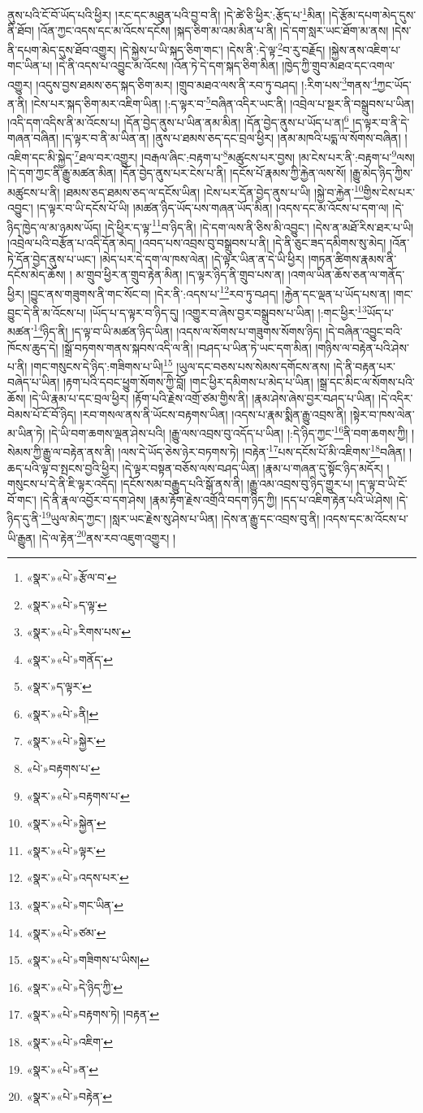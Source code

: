ནུས་པའི་ངོ་བོ་ཡོད་པའི་ཕྱིར། །རང་དང་མཐུན་པའི་བྱ་བ་ནི། །དེ་ཚེ་ཅི་ཕྱིར་:རྩོད་པ་\footnote{«སྣར་»«པེ་»རྩོལ་བ་}མིན། །དེ་རྩོམ་དཔག་མེད་དུས་ནི་ཐོབ། །འོན་ཀྱང་འདས་དང་མ་འོངས་དངོས། །སྐད་ཅིག་མ་འམ་མིན་པ་ནི། །དེ་དག་སླར་ཡང་ཐོག་མ་ནས། །དེས་ནི་དཔག་མེད་དུས་ཐོབ་འགྱུར། །དེ་སྐྱེས་པ་ཡི་སྐད་ཅིག་གང་། །དེས་ནི་:དེ་ལྟ་\footnote{«སྣར་»«པེ་»ད་ལྟ་}བ་རུ་བརྗོད། །སྐྱེས་ནས་འཇིག་པ་གང་ཡིན་པ། །དེ་ནི་འདས་པ་འབྱུང་མ་འོངས། །འོན་ཏེ་དེ་དག་སྐད་ཅིག་མིན། །ཁྱེད་ཀྱི་གྲུབ་མཐའ་དང་འགལ་འགྱུར། །འདུས་བྱས་ཐམས་ཅད་སྐད་ཅིག་མར། །གྲུབ་མཐའ་ལས་ནི་རབ་ཏུ་བཤད། །:རིག་པས་\footnote{«སྣར་»«པེ་»རིགས་པས་}གནས་\footnote{«སྣར་»«པེ་»གནོད་}ཀྱང་ཡོད་ན་ནི། །ངེས་པར་སྐད་ཅིག་མར་འཇིག་ཡིན། །:ད་ལྟར་བ་\footnote{«སྣར་»ད་ལྟར་}བཞིན་འདིར་ཡང་ནི། །འབྲེལ་པ་སྔར་ནི་བསྒྲུབས་པ་ཡིན། །འདི་དག་འདིས་ནི་མ་འོངས་པ། །དོན་བྱེད་ནུས་པ་ཡིན་ནམ་མིན། །དོན་བྱེད་ནུས་པ་ཡོད་པ་ན།\footnote{«སྣར་»«པེ་»ནི།} །ད་ལྟར་བ་ནི་དེ་གཞན་བཞིན། །ད་ལྟར་བ་ནི་མ་ཡིན་ན། །ནུས་པ་ཐམས་ཅད་དང་བྲལ་ཕྱིར། །ནམ་མཁའི་པདྨ་ལ་སོགས་བཞིན། །འཇིག་དང་མི་སྐྱེད་\footnote{«སྣར་»«པེ་»སྐྱེར་}ཐལ་བར་འགྱུར། །བརྒལ་ཞིང་:བརྟག་པ་\footnote{«པེ་»བརྟགས་པ་}མཚུངས་པར་བྱས། །མ་ངེས་པར་ནི་:བརྟག་པ་\footnote{«སྣར་»«པེ་»བརྟགས་པ་}ལས། །དེ་དག་ཀྱང་ནི་རྒྱུ་མཚན་མིན། །དོན་བྱེད་ནུས་པར་ངེས་པ་ནི། །དངོས་པོ་རྣམས་ཀྱི་རྐྱེན་ལས་སོ། །རྒྱུ་མེད་ཉིད་ཀྱིས་མཚུངས་པ་ནི། །ཐམས་ཅད་ཐམས་ཅད་ལ་དངོས་ཡིན། །ངེས་པར་དོན་བྱེད་ནུས་པ་ཡི། །སྐྱེ་བ་རྐྱེན་\footnote{«སྣར་»«པེ་»སྐྱེན་}གྱིས་ངེས་པར་འབྱུང་། །ད་ལྟར་བ་ཡི་དངོས་པོ་ཡི། །མཚན་ཉིད་ཡོད་པས་གཞན་ཡོད་མིན། །འདས་དང་མ་འོངས་པ་དག་ལ། །དེ་ཉིད་ཁྱེད་ལ་མ་ཉམས་ཡོད། །དེ་ཕྱིར་ད་ལྟ་\footnote{«སྣར་»«པེ་»ལྟར་}བ་ཉིད་ནི། །དེ་དག་ལས་ནི་ཅིས་མི་འབྱུང་། །དེས་ན་མཐོ་རིས་ཐར་པ་ཡི། །འབྲེལ་པའི་བརྩོན་པ་འདི་དོན་མེད། །འབད་པས་འབྲས་བུ་བསྒྲུབས་པ་ནི། །དེ་ནི་ཅུང་ཟད་དམིགས་སུ་མེད། །འོན་ཏེ་དོན་བྱེད་ནུས་པ་ཡང་། །མེད་པར་དེ་དག་ལ་ཁས་ལེན། །དེ་ལྟར་ཡིན་ན་དེ་ཡི་ཕྱིར། །གཏན་ཚིགས་རྣམས་ནི་དངོས་མེད་ཆོས། །
མ་གྲུབ་ཕྱིར་ན་གྲུབ་རྟེན་མིན། །ད་ལྟར་ཉིད་ནི་གྲུབ་པས་ན། །འགལ་ཡིན་ཆོས་ཅན་ལ་གནོད་ཕྱིར། །བྱུང་ནས་གཟུགས་ནི་གང་སོང་བ། །དེར་ནི་:འདས་པ་\footnote{«སྣར་»«པེ་»འདས་པར་}རབ་ཏུ་བཤད། །རྐྱེན་དང་ལྡན་པ་ཡོད་པས་ན། །གང་བྱུང་དེ་ནི་མ་འོངས་པ། །ཡོད་པ་ད་ལྟར་བ་ཉིད་དུ། །འགྱུར་བ་ཞེས་བྱར་བསྒྲུབས་པ་ཡིན། །:གང་ཕྱིར་\footnote{«སྣར་»«པེ་»གང་ཡིན་}ཡོད་པ་མཚན་\footnote{«སྣར་»«པེ་»ཙམ་}ཉིད་ནི། །ད་ལྟ་བ་ཡི་མཚན་ཉིད་ཡིན། །འདས་ལ་སོགས་པ་གཟུགས་སོགས་ཉིད། །དེ་བཞིན་འབྱུང་བའི་ཁོངས་ཆུད་དེ། །སྒྲོ་བཏགས་གནས་སྐབས་འདི་ལ་ནི། །བཤད་པ་ཡིན་ཏེ་ཡང་དག་མིན། །གཉིས་ལ་བརྟེན་པའི་ཤེས་པ་ནི། །གང་གསུངས་དེ་ཉིད་:གཟིགས་པ་ཡི།\footnote{«སྣར་»«པེ་»གཟིགས་པ་ཡིས།} །ཡུལ་དང་བཅས་པས་སེམས་དགོངས་ནས། །དེ་ནི་བརྟན་པར་བཞེད་པ་ཡིན། །རྟག་པའི་དབང་ཕྱུག་སོགས་ཀྱི་བློ། །གང་ཕྱིར་དམིགས་པ་མེད་པ་ཡིན། །སྒྲ་དང་མིང་ལ་སོགས་པའི་ཆོས། །དེ་ཡི་རྣམ་པ་དང་བྲལ་ཕྱིར། །རྟོག་པའི་རྗེས་འགྲོ་ཙམ་གྱིས་ནི། །རྣམ་ཤེས་ཞེས་བྱར་བཤད་པ་ཡིན། །དེ་འདིར་བེམས་པོ་ངོ་བོ་ཉིད། །རབ་གསལ་ནས་ནི་ཡོངས་བརྟགས་ཡིན། །འདས་པ་རྣམ་སྨིན་རྒྱུ་འབྲས་ནི། །སྟེར་བ་ཁས་ལེན་མ་ཡིན་ཏེ། །དེ་ཡི་བག་ཆགས་ལྡན་ཤེས་པའི། །རྒྱུ་ལས་འབྲས་བུ་འདོད་པ་ཡིན། །:དེ་ཉིད་ཀྱང་\footnote{«སྣར་»«པེ་»དེ་ཉིད་ཀྱི་}ནི་བག་ཆགས་ཀྱི། །སེམས་ཀྱི་རྒྱུ་ལ་བརྟེན་ནས་ནི། །ལས་དེ་ཡོད་ཅེས་ཉེར་བཏགས་ཏེ། །བརྟེན་\footnote{«སྣར་»«པེ་»བརྟགས་ཏེ། །བརྟན་}པས་དངོས་པོ་མི་འཇིགས་\footnote{«སྣར་»«པེ་»འཇིག་}བཞིན། །ཆད་པའི་ལྟ་བ་སྤངས་བྱའི་ཕྱིར། །དེ་ལྟར་བསྟན་བཅོས་ལས་བཤད་ཡིན། །རྣམ་པ་གཞན་དུ་སྟོང་ཉིད་མདོར། །གསུངས་པ་དེ་ནི་ཇི་ལྟར་འདོད། །དངོས་སམ་བརྒྱུད་པའི་སྒོ་ནས་ནི། །རྒྱུ་འམ་འབྲས་བུ་ཉིད་གྱུར་པ། །ད་ལྟ་བ་ཡི་ངོ་བོ་གང་། །དེ་ནི་རྣལ་འབྱོར་བ་དག་ཤེས། །རྣམ་རྟོག་རྗེས་འགྲོའི་བདག་ཉིད་ཀྱི། །དད་པ་འཇིག་རྟེན་པའི་ཡེ་ཤེས། །དེ་ཉིད་དུ་ནི་\footnote{«སྣར་»«པེ་»ན་}ཡུལ་མེད་ཀྱང་། །སླར་ཡང་རྗེས་སུ་ཤེས་པ་ཡིན། །དེས་ན་རྒྱུ་དང་འབྲས་བུ་ནི། །འདས་དང་མ་འོངས་པ་ཡི་རྒྱུན། །དེ་ལ་རྟེན་\footnote{«སྣར་»«པེ་»བརྟེན་}ནས་རབ་འཇུག་འགྱུར། །
